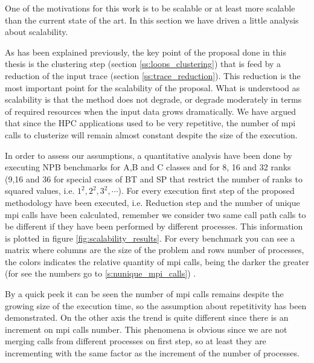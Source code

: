 One of the motivations for this work is to be scalable or at least more scalable
than the current state of the art. In this section we have driven a little analysis
about scalability. 

As has been explained previously, the key point of the proposal done in this
thesis is the clustering step (section \ref{ss:loops_clustering}) that is feed
by a reduction of the input trace (section \ref{ss:trace_reduction}). This
reduction is the most important point for the scalability of the proposal. What
is understood as scalability is that the method does not degrade, or degrade
moderately in terms of required resources when the input data grows
dramatically. We have argued that since the HPC applications used to be very
repetitive, the number of mpi calls to clusterize will remain almost constant
despite the size of the execution. 

In order to assess our assumptions, a quantitative analysis have been done by
executing NPB benchmarks for A,B and C classes and for 8, 16 and 32 ranks (9,16
and 36 for special cases of BT and SP that restrict the number of ranks to
squared values, i.e. $1^{2}, 2^{2}, 3^{2}, \cdots$). For every execution first
step of the proposed methodology have been executed, i.e. Reduction step and
the number of unique mpi calls have been calculated, remember we consider two
same call path calls to be different if they have been performed by different
processes. This information is plotted
in figure \ref{fig:scalability_results}. For every benchmark you can see a
matrix where columns are the size of the problem and rows number of processes, the
colors indicates the relative quantity of mpi calls, being the darker the
greater (for see the numbers go to \ref{s:nunique_mpi_calls}) . 

By a quick peek it can be seen the number of mpi calls remains despite the
growing size of the execution time, so the assumption about repetitivity has 
been demonstrated. On the other axis the trend is quite different since there is
an increment on mpi calls number. This phenomena is obvious since we are not
merging calls from different processes on first step, so at least they are
incrementing with the same factor as the increment of the number of processes.

